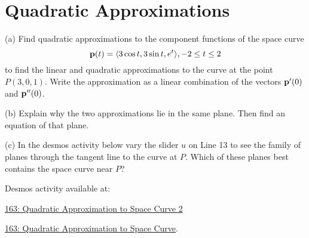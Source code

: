 \documentclass{ximera}
\begin{document}
\section{Quadratic Approximations}


\begin{question}  \label{Qgtyhtsry}
(a) Find quadratic approximations to the component functions of the space curve
\[
   {\bf p}(t) = \langle  3 \cos t, 3\sin t, e^t \rangle , -2\leq t \leq 2
\]
to find the linear and quadratic approximations to the curve at the point $P(3,0,1)$. Write the approximation as a linear combination of the vectors ${\bf p}^\prime(0)$ and ${\bf p}^{\prime\prime}(0)$.

(b) Explain why the two approximations lie in the same plane. Then find an equation of that plane.

(c) In the desmos activity below vary the slider $u$ on Line 13 to see the family of planes through the tangent line to the curve at $P$. Which of these planes best contains the space curve near $P$?

Desmos activity available at:

\href{https://www.desmos.com/3d/196e85fe1a}{163: Quadratic Approximation to Space Curve 2}


\href{https://www.desmos.com/3d/a263cd2883}{163: Quadratic Approximation to Space Curve}.

 

\end{question}
\end{document}
